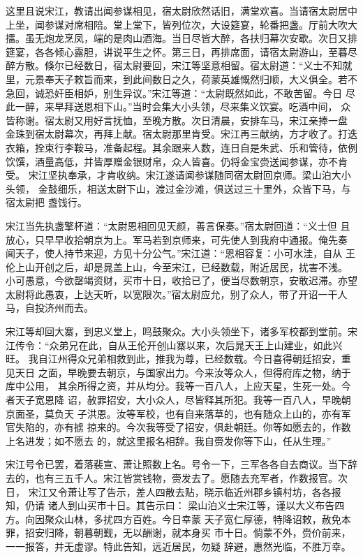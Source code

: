 这里且说宋江，教请出闻参谋相见，宿太尉欣然话旧，满堂欢喜。当请宿太尉居中
上坐，闻参谋对席相陪。堂上堂下，皆列位次，大设筵宴，轮番把盏。厅前大吹大
擂。虽无炮龙烹凤，端的是肉山酒海。当日尽皆大醉，各扶归幕次安歇。次日又排
筵宴，各各倾心露胆，讲说平生之怀。第三日，再排席面，请宿太尉游山，至暮尽
醉方散。倏尔已经数日，宿太尉要回，宋江等坚意相留。宿太尉道：“义士不知就
里，元景奉天子敕旨而来，到此间数日之久，荷蒙英雄慨然归顺，大义俱全。若不
急回，诚恐奸臣相妒，别生异议。”宋江等道：“太尉既然如此，不敢苦留。今日
尽此一醉，来早拜送恩相下山。”当时会集大小头领，尽来集义饮宴。吃酒中间，
众皆称谢。宿太尉又用好言抚恤，至晚方散。次日清晨，安排车马，宋江亲捧一盘
金珠到宿太尉幕次，再拜上献。宿太尉那里肯受。宋江再三献纳，方才收了。打迭
衣箱，拴束行李鞍马，准备起程。其余跟来人数，连日自是朱武、乐和管待，依例
饮馔，酒量高低，并皆厚赠金银财帛，众人皆喜。仍将金宝赍送闻参谋，亦不肯受。
宋江坚执奉承，才肯收纳。宋江遂请闻参谋随同宿太尉回京师。梁山泊大小头领，
金鼓细乐，相送太尉下山，渡过金沙滩，俱送过三十里外，众皆下马，与宿太尉把
盏饯行。

宋江当先执盏擎杯道：“太尉恩相回见天颜，善言保奏。”宿太尉回道：“义士但
且放心，只早早收拾朝京为上。军马若到京师来，可先使人到我府中通报。俺先奏
闻天子，使人持节来迎，方见十分公气。”宋江道：“恩相容复：小可水洼，自从
王伦上山开创之后，却是晁盖上山，今至宋江，已经数载，附近居民，扰害不浅。
小可愚意，今欲罄竭资财，买市十日，收拾已了，便当尽数朝京，安敢迟滞。亦望
太尉将此愚衷，上达天听，以宽限次。”宿太尉应允，别了众人，带了开诏一干人
马，自投济州而去。

宋江等却回大寨，到忠义堂上，鸣鼓聚众。大小头领坐下，诸多军校都到堂前。宋
江传令：“众弟兄在此，自从王伦开创山寨以来，次后晁天王上山建业，如此兴旺。
我自江州得众兄弟相救到此，推我为尊，已经数载。今日喜得朝廷招安，重见天日
之面，早晚要去朝京，与国家出力。今来汝等众人，但得府库之物，纳于库中公用，
其余所得之资，并从均分。我等一百八人，上应天星，生死一处。今者天子宽恩降
诏，赦罪招安，大小众人，尽皆释其所犯。我等一百八人，早晚朝京面圣，莫负天
子洪恩。汝等军校，也有自来落草的，也有随众上山的，亦有军官失陷的，亦有掳
掠来的。今次我等受了招安，俱赴朝廷。你等如愿去的，作数上名进发；如不愿去
的，就这里报名相辞。我自赍发你等下山，任从生理。”

宋江号令已罢，着落裴宣、萧让照数上名。号令一下，三军各各自去商议。当下辞
去的，也有三五千人。宋江皆赏钱物，赍发去了。愿随去充军者，作数报官。次日，
宋江又令萧让写了告示，差人四散去贴，晓示临近州郡乡镇村坊，各各报知，仍请
诸人到山买市十日。其告示曰：
梁山泊义士宋江等，谨以大义布告四方。向因聚众山林，多扰四方百姓。今日幸蒙
天子宽仁厚德，特降诏敕，赦免本罪，招安归降，朝暮朝觐，无以酬谢，就本身买
市十日。倘蒙不外，赍价前来，一一报答，并无虚谬。特此告知，远近居民，勿疑
辞避，惠然光临，不胜万幸。

